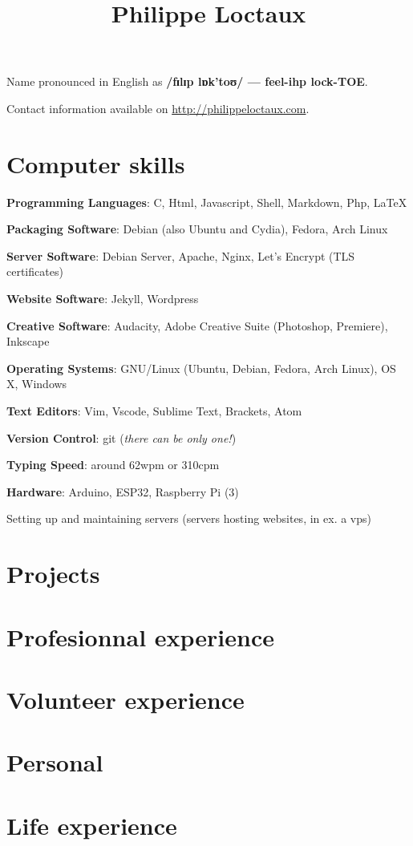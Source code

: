 \documentclass[a4paper]{article}
\title{Philippe Loctaux}
\date{\vspace{-5ex}}
\begin{document}
\maketitle

Name pronounced in English as \textbf{/fɪlɪp lɒk’toʊ/ — feel-ihp lock-TOE}.%

Contact information available on \url{http://philippeloctaux.com}.

\section*{Computer skills}

\begin{description}
	\item \textbf{Programming Languages}: C, Html, Javascript, Shell, Markdown, Php, \LaTeX
	\item \textbf{Packaging Software}: Debian (also Ubuntu and Cydia), Fedora, Arch Linux
	\item \textbf{Server Software}: Debian Server, Apache, Nginx, Let's Encrypt (TLS certificates)
	\item \textbf{Website Software}: Jekyll, Wordpress
	\item \textbf{Creative Software}: Audacity, Adobe Creative Suite (Photoshop, Premiere), Inkscape
	\item \textbf{Operating Systems}: GNU/Linux (Ubuntu, Debian, Fedora, Arch Linux), OS X, Windows
	\item \textbf{Text Editors}: Vim, Vscode, Sublime Text, Brackets, Atom
	\item \textbf{Version Control}: git (\textit{there can be only one!})
	\item \textbf{Typing Speed}: around 62wpm or 310cpm
	\item \textbf{Hardware}: Arduino, ESP32, Raspberry Pi (3)
	\item Setting up and maintaining servers (servers hosting websites, in ex. a vps)
\end{description}

\section*{Projects}
\section*{Profesionnal experience}
\section*{Volunteer experience}
\section*{Personal}
\section*{Life experience}
\end{document}
